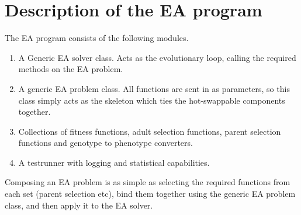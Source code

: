 \section{Description of the EA program}

The EA program consists of the following modules.

\begin{enumerate}
\item A Generic EA solver class. Acts as the evolutionary loop, calling the required methods on the EA problem.
\item A generic EA problem class. All functions are sent in as parameters, so this class simply acts as the skeleton which ties the hot-swappable components together.
\item Collections of fitness functions, adult selection functions, parent selection functions and genotype to phenotype converters.
\item A testrunner with logging and statistical capabilities.
\end{enumerate}

Composing an EA problem is as simple as selecting the required functions from each set (parent selection etc), bind them together using the generic EA problem class, and then apply it to the EA solver.
